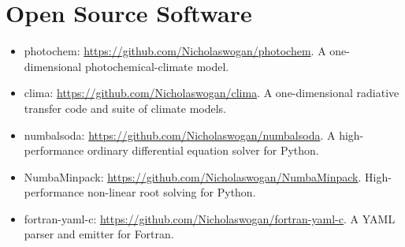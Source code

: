 \documentclass{article}
\begin{document}
\section{Open Source Software}

\begin{itemize}
  \item photochem: \url{https://github.com/Nicholaswogan/photochem}. A one-dimensional photochemical-climate model.
  \item clima: \url{https://github.com/Nicholaswogan/clima}. A one-dimensional radiative transfer code and suite of climate models. 
  \item numbalsoda: \url{https://github.com/Nicholaswogan/numbalsoda}. A high-performance ordinary differential equation solver for Python.
  \item NumbaMinpack: \url{https://github.com/Nicholaswogan/NumbaMinpack}. High-performance non-linear root solving for Python.
  \item fortran-yaml-c: \url{https://github.com/Nicholaswogan/fortran-yaml-c}. A YAML parser and emitter for Fortran.
\end{itemize}
\end{document}
